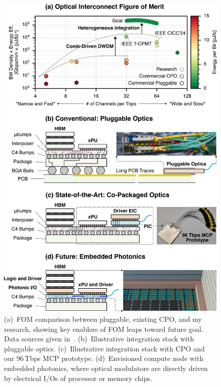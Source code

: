\begin{figure}
    \vspace{-1em}
    \begin{center}
        \includegraphics[width=\linewidth]{../../6_figures/rs_fig_1_empho.png}
    \end{center}
    \caption{(a)~FOM comparison between pluggable, existing CPO, and my research, showing key enablers of FOM leaps toward future goal. Data sources given in~\cite{wangCoDesignedSiliconPhotonics2024}. (b)~Illustrative integration stack with pluggable optics. (c)~Illustrative integration stack with CPO and our 96\,Tbps MCP prototype. (d)~Envisioned compute node with embedded photonics, where optical modulators are directly driven by electrical I/Os of processor or memory chips.}
    \label{fig:embedded_photonics}
    \vspace{-3em}
\end{figure}

